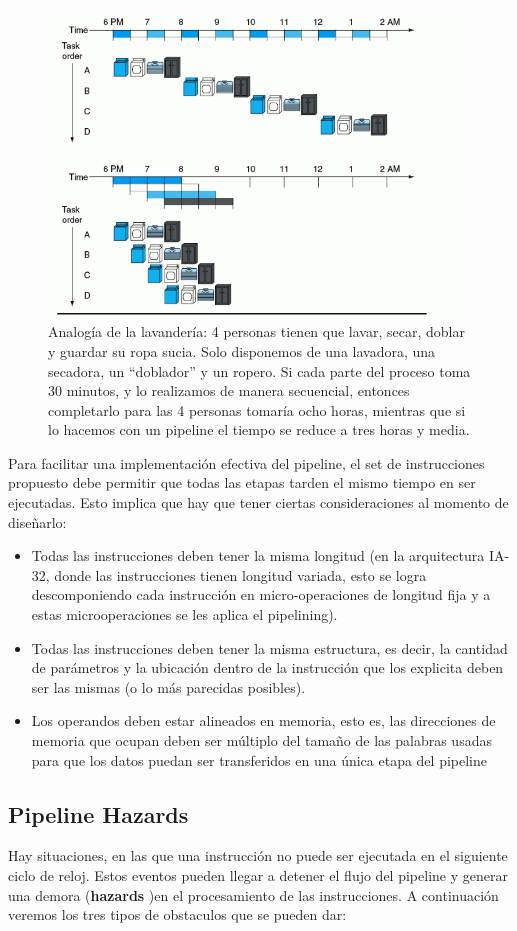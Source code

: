\begin{figure}[h]
	\centering
	\includegraphics[width=0.5\linewidth]{imagenes/pipelining}
	\caption{Analogía de la lavandería: 4 personas tienen que lavar, secar, doblar y guardar su ropa sucia. Solo disponemos de una lavadora, una secadora, un ``doblador'' y un ropero. Si cada parte del proceso toma 30 minutos, y lo realizamos de manera secuencial, entonces completarlo para las 4 personas tomaría ocho horas, mientras que si lo hacemos con un pipeline el tiempo se reduce a tres horas y media.}
	\label{fig:pipelining}
\end{figure}

Para facilitar una implementación efectiva del pipeline, el set de instrucciones propuesto debe permitir que todas las etapas tarden el mismo tiempo en ser ejecutadas. Esto implica que hay que tener ciertas consideraciones al momento de diseñarlo:

\begin{itemize}
	\item Todas las instrucciones deben tener la misma longitud (en la arquitectura IA-32, donde las instrucciones tienen longitud variada, esto se logra descomponiendo cada instrucción en micro-operaciones de longitud fija y a estas microoperaciones se les aplica el pipelining).
	\item Todas las instrucciones deben tener la misma estructura, es decir, la cantidad de parámetros y la ubicación dentro de la instrucción que los explicita deben ser las mismas (o lo más parecidas posibles). 
	\item Los operandos deben estar alineados en memoria, esto es, las direcciones de memoria que ocupan deben ser múltiplo del tamaño de las palabras usadas para que los datos puedan ser transferidos en una única etapa del pipeline
\end{itemize}

\subsection{Pipeline Hazards}
Hay situaciones, en las que una instrucción no puede ser ejecutada en el siguiente ciclo de reloj. Estos eventos pueden llegar a detener el flujo del pipeline y generar una demora (\textbf{hazards} )en el procesamiento de las instrucciones. A continuación veremos los tres tipos de obstaculos que se pueden dar:

